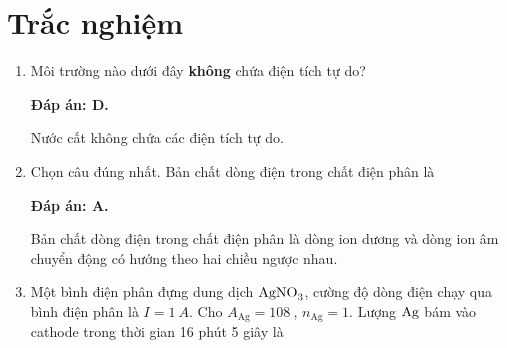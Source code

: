 \whiteBGstarBegin
\setcounter{section}{0}
\section{Trắc nghiệm}
\begin{enumerate}[label=\bfseries Câu \arabic*:]
	
	
	\item {}
	
	\cauhoi
	{Môi trường nào dưới đây \textbf{không} chứa điện tích tự do?
		
	}
	\loigiai
	{	\textbf{Đáp án: D.}
		
		Nước cất không chứa các điện tích tự do.
	}
	\item {}
	
	\cauhoi
	{Chọn câu đúng nhất. Bản chất dòng điện trong chất điện phân là
		
	}
	\loigiai
	{	\textbf{Đáp án: A.}
		
		Bản chất dòng điện trong chất điện phân là dòng ion dương và dòng ion âm chuyển động có hướng theo hai chiều ngược nhau.
	}
	\item {}
	
	\cauhoi
	{Một bình điện phân đựng dung dịch $\ce{AgNO_3}$, cường độ dòng điện chạy qua bình điện phân là $I=\SI{1}{A}$. Cho $A_\text{Ag} = \SI{108}{}$, $n_\text{Ag} = 1$. Lượng $\ce{Ag}$ bám vào cathode trong thời gian 16 phút 5 giây là
		
}
\end{enumerate}

